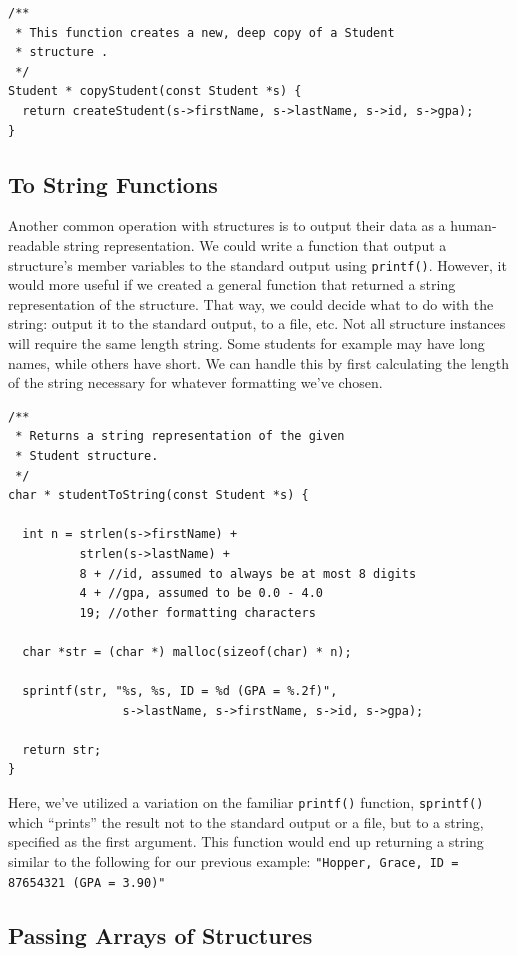 \begin{verbatim}
/**
 * This function creates a new, deep copy of a Student 
 * structure .
 */
Student * copyStudent(const Student *s) {
  return createStudent(s->firstName, s->lastName, s->id, s->gpa);
}
\end{verbatim}

\subsection{To String Functions}

Another common operation with structures is to output their data
as a human-readable string representation.  We could write
a function that output a structure's member variables to the standard
output using \texttt{printf()}.  However, it would more 
useful if we created a general function that returned a 
string representation of the structure.  That way, we could decide
what to do with the string: output it to the standard output,
to a file, etc.  Not all structure instances will require the same 
length string.
Some students for example may have long names, while others have
short.  We can handle this by first calculating the length of 
the string necessary for whatever formatting we've chosen.

\begin{verbatim}
/**
 * Returns a string representation of the given 
 * Student structure.
 */
char * studentToString(const Student *s) {

  int n = strlen(s->firstName) + 
          strlen(s->lastName) + 
          8 + //id, assumed to always be at most 8 digits
          4 + //gpa, assumed to be 0.0 - 4.0
          19; //other formatting characters
          
  char *str = (char *) malloc(sizeof(char) * n);

  sprintf(str, "%s, %s, ID = %d (GPA = %.2f)", 
                s->lastName, s->firstName, s->id, s->gpa);

  return str;
}
\end{verbatim}

Here, we've utilized a variation on the familiar \texttt{printf()}
function, \texttt{sprintf()} which ``prints'' the result not
to the standard output or a file, but to a string, specified as
the first argument.  This function would end up returning a string 
similar to the following for our previous example: 
\texttt{"Hopper, Grace, ID = 87654321 (GPA = 3.90)"}

\subsection{Passing Arrays of Structures}

